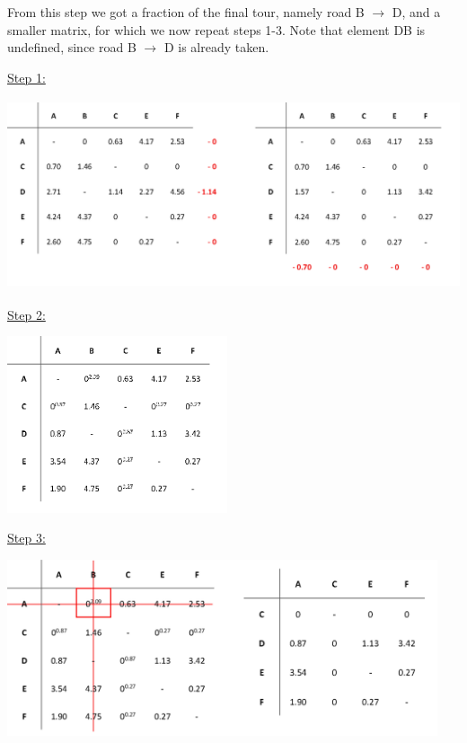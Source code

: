 \noindent
From this step we got a fraction of the final tour, namely road B $\rightarrow$ D, and a smaller matrix, for which we now repeat steps 1-3. Note that element DB is undefined, since road B $\rightarrow$ D is already taken.
	

\vspace{5mm}
\underline{Step 1:}

\begin{center}
	\includegraphics[height=5.6cm]{2red0} 
\end{center}	

\vspace{-3mm}
\underline{Step 2:}

\begin{center}
	\includegraphics[height=5.2cm]{2pen}
\end{center}	
	
	
\underline{Step 3:}

\begin{center}
	\includegraphics[height=5.2cm]{2elim3}
\end{center}

